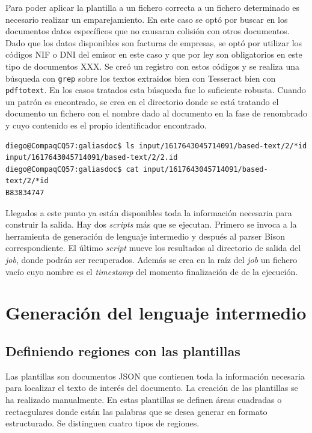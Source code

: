 
Para poder aplicar la plantilla a un fichero correcta a un fichero determinado es necesario realizar un emparejamiento. En este caso se optó por buscar en los documentos datos específicos que no causaran colisión con otros documentos. Dado que los datos disponibles son facturas de empresas, se optó por utilizar los códigos NIF o DNI del emisor en este caso y que por ley son obligatorios en este tipo de documentos XXX. Se creó un registro con estos códigos y se realiza una búsqueda con \verb|grep| sobre los textos extraidos bien con Tesseract bien con \verb|pdftotext|. En los casos tratados esta búsqueda fue lo suficiente robusta.
Cuando un patrón es encontrado, se crea en el directorio donde se está tratando el documento un fichero con el nombre dado al documento en la fase de renombrado y cuyo contenido es el propio identificador encontrado.

\begin{verbatim}
diego@CompaqCQ57:galiasdoc$ ls input/1617643045714091/based-text/2/*id
input/1617643045714091/based-text/2/2.id
diego@CompaqCQ57:galiasdoc$ cat input/1617643045714091/based-text/2/*id
B83834747
\end{verbatim}

Llegados a este punto ya están disponibles toda la información necesaria para construir la salida. Hay dos \emph{scripts} más que se ejecutan. Primero se invoca a la herramienta de generación de lenguaje intermedio y después al parser Bison correspondiente. El último \emph{script} mueve los resultados al directorio de salida del \emph{job}, donde podrán ser recuperados. Además se crea en la raíz del \emph{job} un fichero vacío cuyo nombre es el \emph{timestamp} del momento finalización de de la ejecución.

\section{Generación del lenguaje intermedio}

\subsection{Definiendo regiones con las plantillas}

Las plantillas son documentos JSON que contienen toda la información necesaria para localizar el texto de interés del documento. La creación de las plantillas se ha realizado manualmente. En estas plantillas se definen áreas cuadradas o rectacgulares donde están las palabras que se desea generar en formato estructurado. Se distinguen cuatro tipos de regiones.

